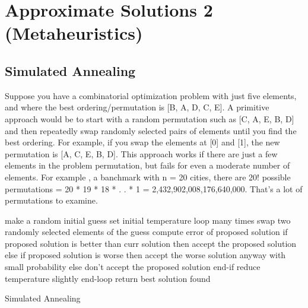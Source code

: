 \chapter{Approximate Solutions 2 (Metaheuristics)}

    \section{Simulated Annealing}


    
    \begin{algorithm}

        Suppose you have a combinatorial optimization problem with just five elements, and where the best ordering/permutation is [B, A, D, C, E]. A primitive approach would be to start with a random permutation such as [C, A, E, B, D] and then repeatedly swap randomly selected pairs of elements until you find the best ordering. For example, if you swap the elements at [0] and [1], the new permutation is [A, C, E, B, D].
      This approach works if there are just a few elements in the problem permutation, but fails for even a moderate number of elements. For example , a banchmark with n = 20 cities, there are 20! possible permutations = 20 * 19 * 18 * . . * 1 = 2,432,902,008,176,640,000. That's a lot of permutations to examine.

        
      make a random initial guess
      set initial temperature
      loop many times
        swap two randomly selected elements of the guess
        compute error of proposed solution
        if proposed solution is better than curr solution then
          accept the proposed solution
        else if proposed solution is worse then
          accept the worse solution anyway with small probability
        else
          don't accept the proposed solution
        end-if
        reduce temperature slightly
      end-loop
      return best solution found



        \caption{Simulated Annealing \TSP}
        \label{algo:simulated-annealing}



\end{algorithm}
